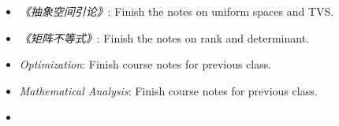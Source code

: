 \documentclass[UTF8]{ctexart}
\begin{document}
\begin{itemize}
    \item \textit{《抽象空间引论》}: Finish the notes on uniform spaces and TVS.
    \item \textit{《矩阵不等式》}: Finish the notes on rank and determinant.
    \item \textit{Optimization}: Finish course notes for previous class.
    \item \textit{Mathematical Analysis}: Finish course notes for previous class.
\end{itemize}

\begin{itemize}
    \item 
\end{itemize}

\end{document}

